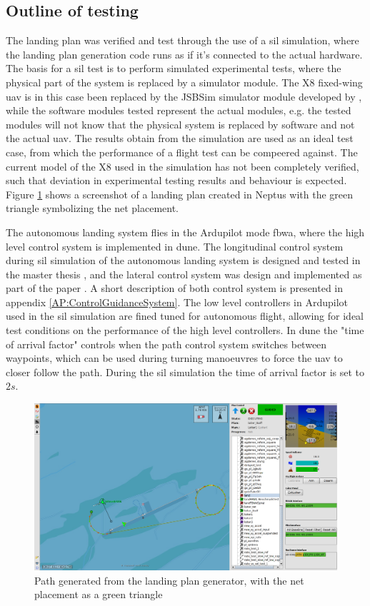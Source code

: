 \subsection{Outline of testing}\label{ss:SILOutline}
The landing plan was verified and test through the use of a \gls{sil} simulation, where the landing plan generation code runs as if it's connected to the actual hardware. The basis for a \gls{sil} test is to perform simulated experimental tests, where the physical part of the system is replaced by a simulator module.  The X8 fixed-wing \gls{uav} is in this case been replaced by the JSBSim simulator module developed by \citep{Gryte}, while the software modules tested represent the actual modules, e.g. the tested modules will not know that the physical system is replaced by software and not the actual \gls{uav}. The results obtain from the simulation are used as an ideal test case, from which the performance of a flight test can be compeered against. The current model of the X8 used in the simulation has not been completely verified, such that deviation in experimental testing results and behaviour is expected. Figure \ref{Fig:LandingPathNeptus} shows a screenshot of a landing plan created in Neptus with the green triangle symbolizing the net placement.

The autonomous landing system flies in the Ardupilot mode \gls{fbwa}, where the high level control system is implemented in \gls{dune}. The longitudinal control system during \gls{sil} simulation of the autonomous landing system is designed and tested in the master thesis \citep{Sigurd}, and the lateral control system was design and implemented as part of the paper \citep{fortuna2015cascaded}. A short description of both control system is presented in appendix \ref{AP:ControlGuidanceSystem}. The low level controllers in Ardupilot used in the \gls{sil} simulation are fined tuned for autonomous flight, allowing for ideal test conditions on the performance of the high level controllers. In \gls{dune} the "time of arrival factor" controls when the path control system switches between waypoints, which can be used during turning manoeuvres to force the \gls{uav} to closer follow the path. During the \gls{sil} simulation the time of arrival factor is set to $2 s$.
\begin{figure}[H]
\centering
\includegraphics[scale=0.25]{figs/LandingPathNeptus.png}
\caption{Path generated from the landing plan generator, with the net placement as a green triangle}
\label{Fig:LandingPathNeptus}
\end{figure}
